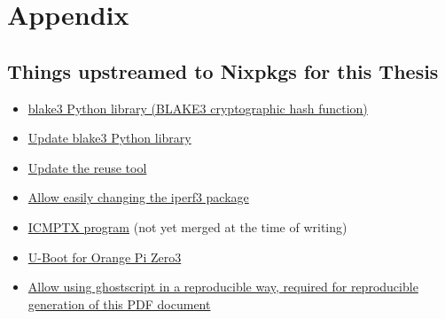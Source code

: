
\chapter{Appendix}
\label{chap:appendix}

\section{Things upstreamed to Nixpkgs for this Thesis}
\begin{itemize}
  \item \href{https://github.com/NixOS/nixpkgs/pull/343277}{blake3 Python library (BLAKE3 cryptographic hash function)}
  \item \href{https://github.com/NixOS/nixpkgs/pull/360435}{Update blake3 Python library}
  \item \href{https://github.com/NixOS/nixpkgs/pull/281636}{Update the reuse tool}
  \item \href{https://github.com/NixOS/nixpkgs/pull/333462}{Allow easily changing the iperf3 package}
  \item \href{https://github.com/NixOS/nixpkgs/pull/357574}{ICMPTX program} (not yet merged at the time of writing)
  \item \href{https://github.com/NixOS/nixpkgs/pull/326845}{U-Boot for Orange Pi Zero3}
  \item \href{https://github.com/NixOS/nixpkgs/pull/362173}{Allow using ghostscript in a reproducible way, required for reproducible generation of this PDF document}
\end{itemize}
